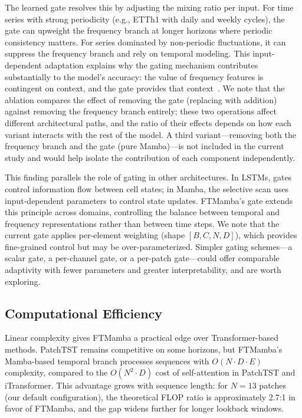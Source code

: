 \documentclass[electronics,article,submit,pdftex,moreauthors]{Definitions/mdpi}
\begin{document}
The learned gate resolves this by adjusting the mixing ratio per input. For time series with strong periodicity (e.g., ETTh1 with daily and weekly cycles), the gate can upweight the frequency branch at longer horizons where periodic consistency matters. For series dominated by non-periodic fluctuations, it can suppress the frequency branch and rely on temporal modeling. This input-dependent adaptation explains why the gating mechanism contributes substantially to the model's accuracy: the value of frequency features is contingent on context, and the gate provides that context~\cite{ref6,ref7}. We note that the ablation compares the effect of removing the gate (replacing with addition) against removing the frequency branch entirely; these two operations affect different architectural paths, and the ratio of their effects depends on how each variant interacts with the rest of the model. A third variant---removing both the frequency branch and the gate (pure Mamba)---is not included in the current study and would help isolate the contribution of each component independently.

This finding parallels the role of gating in other architectures. In LSTMs, gates control information flow between cell states; in Mamba, the selective scan uses input-dependent parameters to control state updates. FTMamba's gate extends this principle across domains, controlling the balance between temporal and frequency representations rather than between time steps. We note that the current gate applies per-element weighting (shape $[B, C, N, D]$), which provides fine-grained control but may be over-parameterized. Simpler gating schemes---a scalar gate, a per-channel gate, or a per-patch gate---could offer comparable adaptivity with fewer parameters and greater interpretability, and are worth exploring.

\subsection{Computational Efficiency}

Linear complexity gives FTMamba a practical edge over Transformer-based methods. PatchTST remains competitive on some horizons, but FTMamba's Mamba-based temporal branch processes sequences with $O(N \cdot D \cdot E)$ complexity, compared to the $O(N^2 \cdot D)$ cost of self-attention in PatchTST and iTransformer. This advantage grows with sequence length: for $N=13$ patches (our default configuration), the theoretical FLOP ratio is approximately 2.7:1 in favor of FTMamba, and the gap widens further for longer lookback windows.
\end{document}

